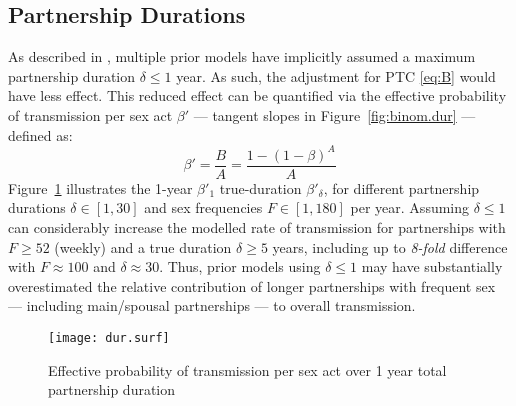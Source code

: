 \subsection{Partnership Durations}\label{foi.exp.dur}
As described in , multiple prior models have
implicitly assumed a maximum partnership duration $\delta \le 1$ year.
As such, the adjustment for PTC \eqref{eq:B} would have less effect.
This reduced effect can be quantified via
the effective probability of transmission per sex act $\beta'$
--- \ie tangent slopes in Figure~\ref{fig:binom.dur} --- defined as:
\begin{equation}\label{eq:beta.eff}
  \beta' = \frac{B}{A} = \frac{1 - {(1 - \beta)}^{A}}{A}
\end{equation}
Figure~\ref{fig:dur.surf} illustrates the 1-year $\beta'_1$ \vs true-duration $\beta'_\delta$, for
different partnership durations $\delta \in [1, 30]$ and sex frequencies $F \in [1,180]$ per year.
Assuming $\delta \le 1$ can considerably increase the modelled rate of transmission
for partnerships with $F \ge 52$ (\ie weekly) and a true duration $\delta \ge 5$ years,
including up to \emph{8-fold} difference with $F \approx 100$ and $\delta \approx 30$.
Thus, prior models using $\delta \le 1$ may have
substantially overestimated the relative contribution of
longer partnerships with frequent sex --- including main/spousal partnerships ---
to overall transmission.
\begin{figure}
  \centering\texttt{[image: dur.surf]}
  \caption{Effective probability of transmission per sex act
    over 1 year \vs total partnership duration}
  \label{fig:dur.surf}
\end{figure}
\clearpage %
